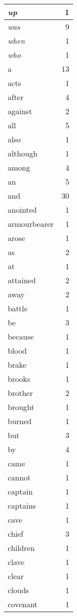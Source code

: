\begin{center}
\begin{longtable}{l|r}
\emph{up} & 1 \\ \hline
\emph{was} & 9 \\ \hline
\emph{when} & 1 \\ \hline
\emph{who} & 1 \\ \hline
a & 13 \\ \hline
acts & 1 \\ \hline
after & 4 \\ \hline
against & 2 \\ \hline
all & 5 \\ \hline
also & 1 \\ \hline
although & 1 \\ \hline
among & 4 \\ \hline
an & 5 \\ \hline
and & 30 \\ \hline
anointed & 1 \\ \hline
armourbearer & 1 \\ \hline
arose & 1 \\ \hline
as & 2 \\ \hline
at & 1 \\ \hline
attained & 2 \\ \hline
away & 2 \\ \hline
battle & 1 \\ \hline
be & 3 \\ \hline
because & 1 \\ \hline
blood & 1 \\ \hline
brake & 1 \\ \hline
brooks & 1 \\ \hline
brother & 2 \\ \hline
brought & 1 \\ \hline
burned & 1 \\ \hline
but & 3 \\ \hline
by & 4 \\ \hline
came & 1 \\ \hline
cannot & 1 \\ \hline
captain & 1 \\ \hline
captains & 1 \\ \hline
cave & 1 \\ \hline
chief & 3 \\ \hline
children & 1 \\ \hline
clave & 1 \\ \hline
clear & 1 \\ \hline
clouds & 1 \\ \hline
covenant & 1 \\ \hline

\end{longtable}
\end{center}
